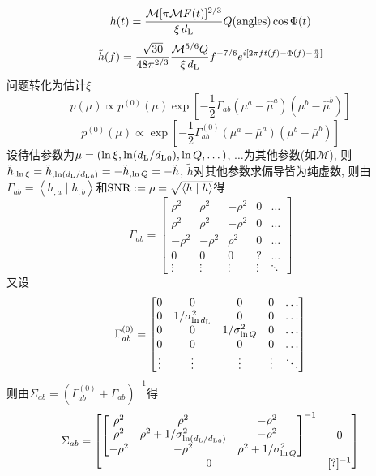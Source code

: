 \cite{Poisson1995}
\begin{equation}
    h(t)=\frac{\mathcal{M}[\pi \mathcal{M}F(t)]^{2/3}}{\xi\,d_\text{L}}Q(\text{angles})\cos\Phi(t)
\end{equation}
\begin{equation}
    \tilde{h}(f)=\frac{\sqrt{30}}{48\pi^{2/3}}\frac{\mathcal{M}^{5/6}Q}{\xi\,d_\text{L}}f^{-7/6}e^{i[2\pi ft(f)-\Phi(f)-\frac{\pi}{4}]}
\end{equation}
问题转化为估计$\xi$
\begin{equation}
    p(\mu)\propto p^{(0)}(\mu)\exp[
        -\frac{1}{2}\Gamma_{ab}(\mu^a-\hat{\mu}^a)(\mu^b-\hat{\mu}^b)
    ]
\end{equation}
\begin{equation}
    p^{(0)}(\mu)\propto\exp[
        -\frac{1}{2}\Gamma^{(0)}_{ab}(\mu^a-\bar{\mu}^a)(\mu^b-\bar{\mu}^b)
    ]
\end{equation}
设待估参数为$\mu=(\ln\xi,\ln (d_\text{L}/{d_\text{L}}_0),\ln Q,\dots)$, $\dots$为其他参数(如$\mathcal{M}$), 则$\tilde{h}_{,\ln\xi}=\tilde{h}_{,\ln (d_\text{L}/{d_\text{L}}_0)}=-\tilde{h}_{,\ln Q}=-\tilde{h}$, $\tilde{h}$对其他参数求偏导皆为纯虚数, 则由$\Gamma_{ab}=\left\langle h_{,a}\mid h_{,b}\right\rangle $和$\text{SNR}:=\rho=\sqrt{\left\langle h\mid h\right\rangle}$得
\begin{equation}
    \Gamma_{ab}=\begin{bmatrix}
        \rho^2&\rho^2&-\rho^2&0&\dots\\
        \rho^2&\rho^2&-\rho^2&0&\dots\\
        -\rho^2&-\rho^2&\rho^2&0&\dots\\
        0&0&0&?&\ldots\\
        \vdots&\vdots&\vdots&\vdots&\ddots 
    \end{bmatrix}
\end{equation}
又设
\begin{equation}
    \Gamma^{(0)}_{ab}=\begin{bmatrix}
        0&0&0&0&\dots\\
        0&1/\sigma_{\ln d_\text{L}}^2&0&0&\dots\\
        0&0&1/\sigma_{\ln Q}^2&0&\dots\\
        0 &0&0&0&\ldots\\
        \vdots&\vdots&\vdots&\vdots&\ddots 
    \end{bmatrix}
\end{equation}
则由$\Sigma_{ab}=(\Gamma^{(0)}_{ab}+\Gamma_{ab})^{-1}$得
\begin{equation}
    \Sigma_{ab}=\begin{bmatrix}
        \begin{bmatrix}
            \rho^2&\rho^2&-\rho^2\\
            \rho^2&\rho^2+1/\sigma_{\ln (d_\text{L}/{d_\text{L}}_0)}^2&-\rho^2\\
            -\rho^2&-\rho^2&\rho^2+1/\sigma_{\ln Q}^2
        \end{bmatrix}^{-1}&0\\
        0&[?]^{-1}
    \end{bmatrix}
\end{equation}
